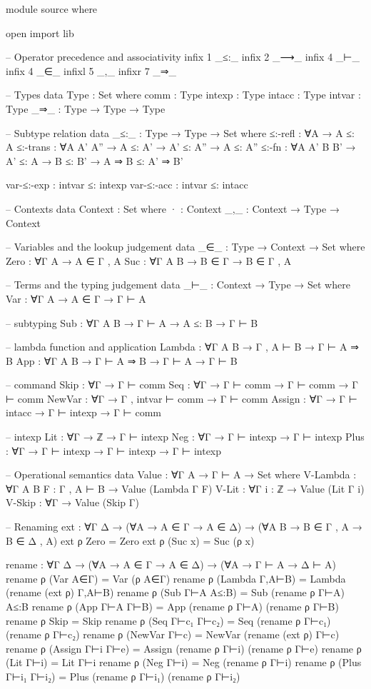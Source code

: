 \documentclass{article}
\begin{document}
\begin{prev}
\begin{code}
module source where

open import lib

-- Operator precedence and associativity
infix 1 _≤:_
infix 2 _⟶_ 
infix 4 _⊢_
infix 4 _∈_
infixl 5 _,_
infixr 7 _⇒_

-- Types
data Type : Set where
    comm : Type
    intexp : Type
    intacc : Type
    intvar : Type
    _⇒_ : Type → Type → Type

-- Subtype relation
data _≤:_ : Type → Type → Set where
    ≤:-refl : ∀{A} → A ≤: A
    ≤:-trans : ∀{A A' A''} → A ≤: A' → A' ≤: A'' → A ≤: A''
    ≤:-fn : ∀{A A' B B'} → A' ≤: A → B ≤: B' → A ⇒ B ≤: A' ⇒ B'

    var-≤:-exp : intvar ≤: intexp
    var-≤:-acc : intvar ≤: intacc

-- Contexts
data Context : Set where
    · : Context
    _,_ : Context → Type → Context

-- Variables and the lookup judgement
data _∈_ : Type → Context → Set where
    Zero : ∀{Γ A} → A ∈ Γ , A
    Suc : ∀{Γ A B} → B ∈ Γ → B ∈ Γ , A

-- Terms and the typing judgement
data _⊢_ : Context → Type → Set where
    Var : ∀{Γ A} → A ∈ Γ → Γ ⊢ A

    -- subtyping
    Sub : ∀{Γ A B} → Γ ⊢ A → A ≤: B → Γ ⊢ B

    -- lambda function and application
    Lambda : ∀{Γ A B} → Γ , A ⊢ B → Γ ⊢ A ⇒ B
    App : ∀{Γ A B} → Γ ⊢ A ⇒ B → Γ ⊢ A → Γ ⊢ B

    -- command
    Skip : ∀{Γ} → Γ ⊢ comm
    Seq : ∀{Γ} → Γ ⊢ comm → Γ ⊢ comm → Γ ⊢ comm
    NewVar : ∀{Γ} → Γ , intvar ⊢ comm → Γ ⊢ comm
    Assign : ∀{Γ} → Γ ⊢ intacc → Γ ⊢ intexp → Γ ⊢ comm

    -- intexp
    Lit : ∀{Γ} → ℤ → Γ ⊢ intexp
    Neg : ∀{Γ} → Γ ⊢ intexp → Γ ⊢ intexp
    Plus : ∀{Γ} → Γ ⊢ intexp → Γ ⊢ intexp → Γ ⊢ intexp


-- Operational semantics
data Value : ∀{Γ A} → Γ ⊢ A → Set where
    V-Lambda : ∀{Γ A B} {F : Γ , A ⊢ B} → Value (Lambda {Γ} F)
    V-Lit : ∀{Γ} {i : ℤ} → Value (Lit {Γ} i)
    V-Skip : ∀{Γ} → Value (Skip {Γ})

-- Renaming
ext : ∀{Γ Δ} → (∀{A} → A ∈ Γ → A ∈ Δ)
             → (∀{A B} → B ∈ Γ , A → B ∈ Δ , A)
ext ρ Zero = Zero
ext ρ (Suc x) = Suc (ρ x)

rename : ∀{Γ Δ} → (∀{A} → A ∈ Γ → A ∈ Δ) 
                → (∀{A} → Γ ⊢ A → Δ ⊢ A)
rename ρ (Var A∈Γ) = Var (ρ A∈Γ)
rename ρ (Lambda Γ,A⊢B) = Lambda (rename (ext ρ) Γ,A⊢B)
rename ρ (Sub Γ⊢A A≤:B) = Sub (rename ρ Γ⊢A) A≤:B
rename ρ (App Γ⊢A Γ⊢B) = App (rename ρ Γ⊢A) (rename ρ Γ⊢B)
rename ρ Skip = Skip
rename ρ (Seq Γ⊢c₁ Γ⊢c₂) = Seq (rename ρ Γ⊢c₁) (rename ρ Γ⊢c₂)
rename ρ (NewVar Γ⊢c) = NewVar (rename (ext ρ) Γ⊢c)
rename ρ (Assign Γ⊢i Γ⊢e) = Assign (rename ρ Γ⊢i) (rename ρ Γ⊢e)
rename ρ (Lit Γ⊢i) = Lit Γ⊢i
rename ρ (Neg Γ⊢i) = Neg (rename ρ Γ⊢i)
rename ρ (Plus Γ⊢i₁ Γ⊢i₂) = Plus (rename ρ Γ⊢i₁) (rename ρ Γ⊢i₂)


\end{code}
\end{prev}
\end{document}

